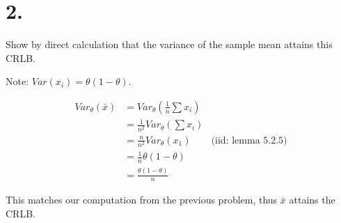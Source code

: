 \section*{2.} 

Show by direct calculation that the variance of the sample mean attains this CRLB.

Note: $Var(x_i) = \theta(1-\theta)$.

\vspace{-5mm}
\begin{align*}
	Var_{\theta}(\bar{x}) &= Var_{\theta}\left( \frac{1}{n} \sum x_i \right) \\
	&= \frac{1}{n^2} Var_{\theta} \left(\sum x_i \right) \\
	&= \frac{n}{n^2} Var_{\theta}(x_1) & \text{(iid: lemma 5.2.5)} \\
	&= \frac{1}{n} \theta(1-\theta) \\
	&= \frac{\theta(1-\theta)}{n}
\end{align*}

This matches our computation from the previous problem, thus $\bar{x}$ attains the CRLB.
